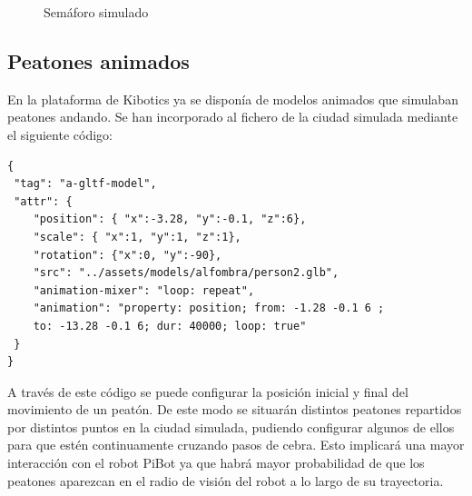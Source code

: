 \documentclass{report}
\begin{document}
\begin{figure}[h]
\begin{subfigure}[b]{0.3\textwidth}
    \label{fig:f2}
  \end{subfigure}
  \caption{Semáforo simulado}
\end{figure}



\subsection{Peatones animados}
En la plataforma de Kibotics ya se disponía de modelos animados que simulaban peatones andando. Se han incorporado al fichero de la ciudad simulada mediante el siguiente código:

\begin{lstlisting}[backgroundcolor = \color{light-gray},
				   aboveskip = 2em,
				   belowskip = 2em,
                   xleftmargin = 2cm,
                   framexleftmargin = 1em,
                   basicstyle=\small]
{
 "tag": "a-gltf-model",
 "attr": {
	"position": { "x":-3.28, "y":-0.1, "z":6},
	"scale": { "x":1, "y":1, "z":1},
	"rotation": {"x":0, "y":-90},
	"src": "../assets/models/alfombra/person2.glb",
	"animation-mixer": "loop: repeat",
	"animation": "property: position; from: -1.28 -0.1 6 ;
	to: -13.28 -0.1 6; dur: 40000; loop: true"
 }
}
\end{lstlisting} 

A través de este código se puede configurar la posición inicial y final del movimiento de un peatón. De este modo se situarán distintos peatones repartidos por distintos puntos en la ciudad simulada, pudiendo configurar algunos de ellos para que estén continuamente cruzando pasos de cebra. Esto implicará una mayor interacción con el robot PiBot ya que habrá mayor probabilidad de que los peatones aparezcan en el radio de visión del robot a lo largo de su trayectoria.
\hfill \break
\end{document}
